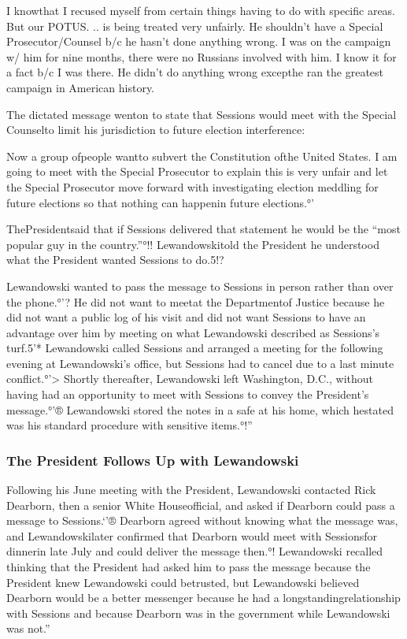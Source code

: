 {I knowthat I recused myself from certain things having to do with specific areas. But our POTUS. .. is being treated very unfairly. He shouldn’t have a Special Prosecutor/Counsel b/c he hasn’t done anything wrong. I was on the campaign w/ him for nine months, there were no Russians involved with him. I know it for a fact b/c I was there. He didn’t do anything wrong excepthe ran the greatest campaign in American history.

The dictated message wenton to state that Sessions would meet with the Special Counselto limit his jurisdiction to future election interference:

Now a group ofpeople wantto subvert the Constitution ofthe United States. I am going to meet with the Special Prosecutor to explain this is very unfair and let the Special Prosecutor move forward with investigating election meddling for future elections so that nothing can happenin future elections.°'

ThePresidentsaid that if Sessions delivered that statement he would be the “most popular guy in the country.”°!! Lewandowskitold the President he understood what the President wanted Sessions to do.5!?

Lewandowski wanted to pass the message to Sessions in person rather than over the phone.°'? He did not want to meetat the Departmentof Justice because he did not want a public log of his visit and did not want Sessions to have an advantage over him by meeting on what Lewandowski described as Sessions’s turf.5'* Lewandowski called Sessions and arranged a meeting for the following evening at Lewandowski’s office, but Sessions had to cancel due to a last minute conflict.°'> Shortly thereafter, Lewandowski left Washington, D.C., without having had an opportunity to meet with Sessions to convey the President’s message.°'® Lewandowski stored the notes in a safe at his home, which hestated was his standard procedure with sensitive items.°!”

\subsubsection{The President Follows Up with Lewandowski}

Following his June meeting with the President, Lewandowski contacted Rick Dearborn, then a senior White Houseofficial, and asked if Dearborn could pass a message to Sessions.‘'® Dearborn agreed without knowing what the message was, and Lewandowskilater confirmed that Dearborn would meet with Sessionsfor dinnerin late July and could deliver the message then.°! Lewandowski recalled thinking that the President had asked him to pass the message because the President knew Lewandowski could betrusted, but Lewandowski believed Dearborn would be a better messenger because he had a longstandingrelationship with Sessions and because Dearborn was in the government while Lewandowski was not.”

}
